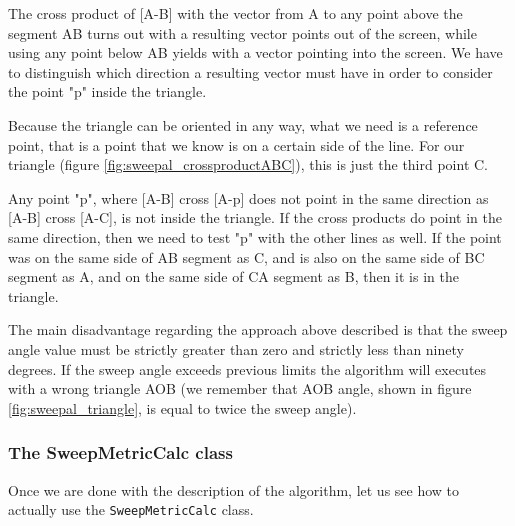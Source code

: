 %
The cross product of [A-B] with the vector from A to any point above the segment AB turns out with a resulting vector
points out of the screen, while using any point below AB yields with a vector pointing into the screen. We have to
distinguish which direction a resulting vector must have in order to consider the point "p" inside the triangle.
%

%
Because the triangle can be oriented in any way, what we need is a reference point, that is a point that we know is
on a certain side of the line. For our triangle (figure \ref{fig:sweepal_crossproductABC}), this is just the third
point C.
%

%
Any point "p", where [A-B] cross [A-p] does not point in the same direction as [A-B] cross [A-C], is not inside the
triangle. If the cross products do point in the same direction, then we need to test "p" with the other lines as well.
If the point was on the same side of AB segment as C, and is also on the same side of BC segment as A, and on the same
side of CA segment as B, then it is in the triangle.
%

%
The main disadvantage regarding the approach above described is that the sweep angle value must be strictly greater
than zero and strictly less than ninety degrees. If the sweep angle exceeds previous limits the algorithm will executes
with a wrong triangle AOB (we remember that AOB angle, shown in figure \ref{fig:sweepal_triangle}, is equal to twice
the sweep angle).
%
\subsubsection{The SweepMetricCalc class}
\label{subsubsec:sweep_metric_class}
Once we are done with the description of the algorithm, 
let us see how to actually use the \texttt{SweepMetricCalc} 
class. 
%

